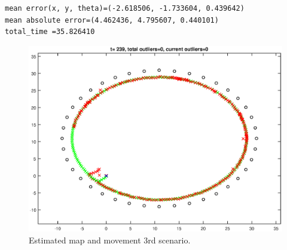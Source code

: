 \documentclass[12pt]{article}
\begin{document}
\begin{verbatim}
mean error(x, y, theta)=(-2.618506, -1.733604, 0.439642)
mean absolute error=(4.462436, 4.795607, 0.440101)
total_time =35.826410
\end{verbatim}

\begin{figure}[htbp]
 \centering
 \includegraphics[width=\textwidth]{test3_fig1}
 \caption{Estimated map and movement 3rd scenario.}
\end{figure}
\end{document}
